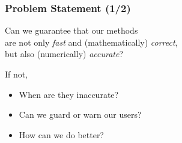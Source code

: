 \begin{frame}

\frametitle{Problem Statement (1/2)}

\vspace{\fill}

\begin{flushright}

Can we guarantee that our methods \\ are not only \emph{fast} and
(mathematically) \emph{correct}, \\ but also (numerically) \emph{accurate}?

\end{flushright}

\vspace{\fill}

If not,

\begin{itemize}

\item When are they inaccurate?

\item Can we guard or warn our users?

\item How can we do better?

\end{itemize}

\vspace{\fill}

\end{frame}
